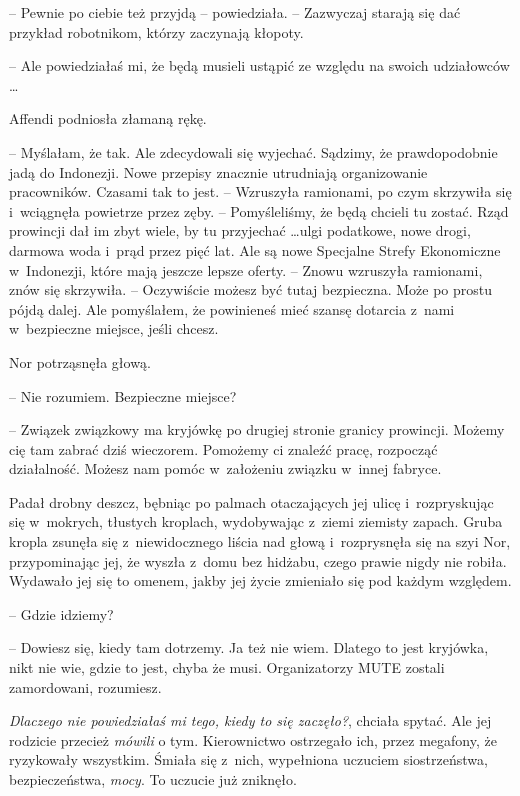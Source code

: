 \documentclass[oneside,polish,11pt,rmheadings]{mwbk}
\begin{document}
-- Pewnie po ciebie też przyjdą -- powiedziała. -- Zazwyczaj starają się dać przykład robotnikom, którzy zaczynają kłopoty. 


-- Ale powiedziałaś mi, że będą musieli ustąpić ze względu na swoich udziałowców \ldots  


Affendi podniosła złamaną rękę. 

-- Myślałam, że tak. Ale zdecydowali się wyjechać. Sądzimy, że prawdopodobnie jadą do Indonezji. Nowe przepisy znacznie utrudniają organizowanie pracowników. Czasami tak to jest. -- Wzruszyła ramionami, po czym skrzywiła się i~wciągnęła powietrze przez zęby. -- Pomyśleliśmy, że będą chcieli tu zostać. Rząd prowincji dał im zbyt wiele, by tu przyjechać \ldots  ulgi podatkowe, nowe drogi, darmowa woda i~prąd przez pięć lat. Ale są nowe Specjalne Strefy Ekonomiczne w~Indonezji, które mają jeszcze lepsze oferty. -- Znowu wzruszyła ramionami, znów się skrzywiła. -- Oczywiście możesz być tutaj bezpieczna. Może po prostu pójdą dalej. Ale pomyślałem, że powinieneś mieć szansę dotarcia z~nami w~bezpieczne miejsce, jeśli chcesz. 


Nor potrząsnęła głową. 

-- Nie rozumiem. Bezpieczne miejsce?  


-- Związek związkowy ma kryjówkę po drugiej stronie granicy prowincji. Możemy cię tam zabrać dziś wieczorem. Pomożemy ci znaleźć pracę, rozpocząć działalność. Możesz nam pomóc w~założeniu związku w~innej fabryce. 


Padał drobny deszcz, bębniąc po palmach otaczających jej ulicę i~rozpryskując się w~mokrych, tłustych kroplach, wydobywając z~ziemi ziemisty zapach. Gruba kropla zsunęła się z~niewidocznego liścia nad głową i~rozprysnęła się na szyi Nor, przypominając jej, że wyszła z~domu bez hidżabu, czego prawie nigdy nie robiła. Wydawało jej się to omenem, jakby jej życie zmieniało się pod każdym względem. 


-- Gdzie idziemy?  


-- Dowiesz się, kiedy tam dotrzemy. Ja też nie wiem. Dlatego to jest kryjówka, nikt nie wie, gdzie to jest, chyba że musi. Organizatorzy MUTE zostali zamordowani, rozumiesz. 


\textit{Dlaczego nie powiedziałaś mi tego, kiedy to się zaczęło?}, chciała spytać. Ale jej rodzicie przecież \textit{mówili} o tym. Kierownictwo ostrzegało ich, przez megafony, że ryzykowały wszystkim. Śmiała się z~nich, wypełniona uczuciem siostrzeństwa, bezpieczeństwa, \textit{mocy}. To uczucie już zniknęło. 
\end{document}
